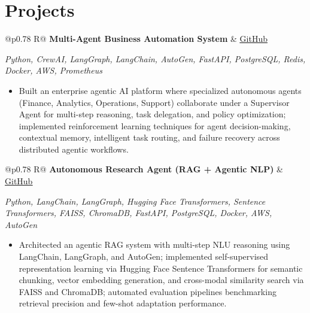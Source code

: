 \documentclass[a4paper,10pt]{article}
\newcommand{\ulink}[2]{\href{#1}{\uline{#2}}}
\newcommand{\subheading}[1]{{\color[HTML]{0A0A0A}\fontsize{12}{14}\selectfont\bfseries #1}}
\newcommand{\techstack}[1]{{\color[HTML]{5C5C5C}\fontsize{10.5}{12.5}\selectfont\itshape #1}}
\newcommand{\meta}[1]{{\color[HTML]{5C5C5C}\fontsize{10.5}{12.5}\selectfont #1}}
\begin{document}
\vspace{2pt}

\section{Projects}
\vspace{2pt}

\begin{tabularx}{\linewidth}{@{}p{0.78\linewidth} R@{}}
\subheading{Multi-Agent Business Automation System} & \meta{\ulink{https://github.com/su-jin1425/Multi-Agent-Business-Automation}{GitHub}}
\end{tabularx}
\vspace{1pt}
\techstack{Python, CrewAI, LangGraph, LangChain, AutoGen, FastAPI, PostgreSQL, Redis, Docker, AWS, Prometheus}
\begin{itemize}[nosep, leftmargin=1.5em, itemsep=1pt, topsep=2pt]
\item {\color[HTML]{0A0A0A}\fontsize{11}{14}\selectfont
Built an enterprise agentic AI platform where specialized autonomous agents (Finance, Analytics, Operations, Support) collaborate under a Supervisor Agent for multi-step reasoning, task delegation, and policy optimization; implemented reinforcement learning techniques for agent decision-making, contextual memory, intelligent task routing, and failure recovery across distributed agentic workflows.}
\end{itemize}

\vspace{2pt}

\begin{tabularx}{\linewidth}{@{}p{0.78\linewidth} R@{}}
\subheading{Autonomous Research Agent (RAG + Agentic NLP)} & \meta{\ulink{https://github.com/su-jin1425/Autonomous-Research-Agent}{GitHub}}
\end{tabularx}
\vspace{1pt}
\techstack{Python, LangChain, LangGraph, Hugging Face Transformers, Sentence Transformers, FAISS, ChromaDB, FastAPI, PostgreSQL, Docker, AWS, AutoGen}
\begin{itemize}[nosep, leftmargin=1.5em, itemsep=1pt, topsep=2pt]
\item {\color[HTML]{0A0A0A}\fontsize{11}{14}\selectfont
Architected an agentic RAG system with multi-step NLU reasoning using LangChain, LangGraph, and AutoGen; implemented self-supervised representation learning via Hugging Face Sentence Transformers for semantic chunking, vector embedding generation, and cross-modal similarity search via FAISS and ChromaDB; automated evaluation pipelines benchmarking retrieval precision and few-shot adaptation performance.}
\end{itemize}
\end{document}
